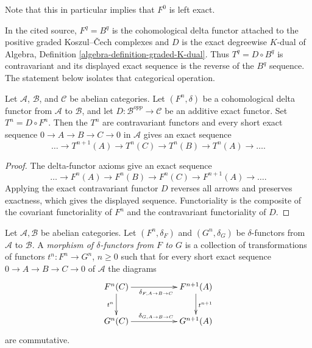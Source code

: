 \noindent
Note that this in particular implies that $F^0$ is left exact.

\begin{lemma}
\label{lemma-dualize-delta-functor}
\begin{reference}
\cite[Chapter III, \S 4, no. 70, exact sequences for the functors
$B^q$ and $T^q$, p. 264]{FAC}
\end{reference}
\begin{history}
In the cited source, $F^q=B^q$ is the cohomological delta functor attached
to the positive graded Koszul--{\v C}ech complexes and $D$ is the exact
degreewise $K$-dual of Algebra, Definition
\ref{algebra-definition-graded-K-dual}. Thus $T^q=D\circ B^q$ is
contravariant and its displayed exact sequence is the reverse of the
$B^q$ sequence. The statement below isolates that categorical operation.
\end{history}
Let $\mathcal A$, $\mathcal B$, and $\mathcal C$ be abelian categories.
Let $(F^n,\delta)$ be a cohomological delta functor from $\mathcal A$ to
$\mathcal B$, and let
$D:\mathcal B^{opp}\to\mathcal C$ be an additive exact functor. Set
$T^n=D\circ F^n$. Then the $T^n$ are contravariant functors and every short
exact sequence $0\to A\to B\to C\to0$ in $\mathcal A$ gives an exact
sequence
$$
\ldots\longrightarrow T^{n+1}(A)\longrightarrow T^n(C)
\longrightarrow T^n(B)\longrightarrow T^n(A)\longrightarrow\ldots.
$$
\end{lemma}

\begin{proof}
The delta-functor axioms give an exact sequence
$$
\ldots\longrightarrow F^n(A)\longrightarrow F^n(B)
\longrightarrow F^n(C)\longrightarrow F^{n+1}(A)\longrightarrow\ldots.
$$
Applying the exact contravariant functor $D$ reverses all arrows and
preserves exactness, which gives the displayed sequence. Functoriality is
the composite of the covariant functoriality of $F^n$ and the
contravariant functoriality of $D$.
\end{proof}

\begin{definition}
\label{definition-morphism-delta-functors}
Let $\mathcal{A}, \mathcal{B}$ be abelian categories.
Let $(F^n, \delta_F)$ and $(G^n, \delta_G)$ be $\delta$-functors
from $\mathcal{A}$ to $\mathcal{B}$. A {\it morphism of $\delta$-functors
from $F$ to $G$} is a collection of
transformations of functors $t^n : F^n \to G^n$, $n \geq 0$ such
that for every short exact sequence $0 \to A \to B \to C \to 0$
of $\mathcal{A}$ the diagrams
$$
\xymatrix{
F^n(C) \ar[d]_{t^n} \ar[rr]_{\delta_{F, A \to B \to C}} &
& F^{n + 1}(A) \ar[d]^{t^{n + 1}} \\
G^n(C) \ar[rr]^{\delta_{G, A \to B \to C}} & & G^{n + 1}(A)
}
$$
are commutative.
\end{definition}

